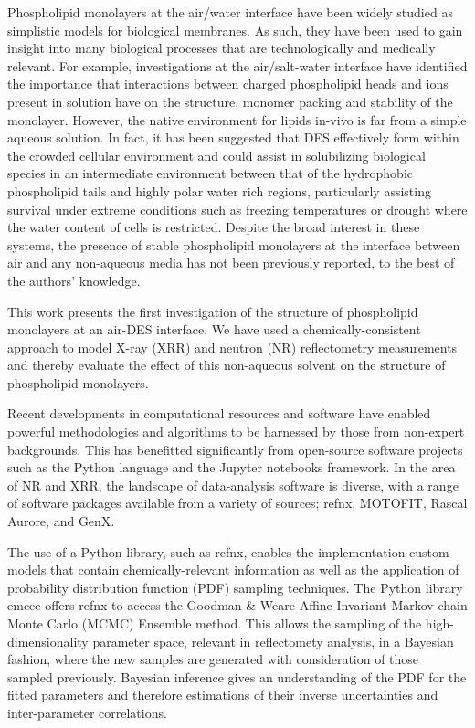 \documentclass[twocolumn,a4paper]{paper}
\begin{document}
Phospholipid monolayers at the air/water interface have been widely studied as simplistic models for biological membranes.
As such, they have been used to gain insight into many biological processes that are technologically and medically relevant.
For example, investigations at the air/salt-water interface have identified the importance that interactions between charged phospholipid heads and ions present in solution have on the structure, monomer packing and stability of the monolayer\cite{Mohwald1990,Kewalramani2010}.
However, the native environment for lipids in-vivo is far from a simple aqueous solution.
In fact, it has been suggested\cite{Choi2011,Hammond2017} that DES effectively form within the crowded cellular environment and could assist in solubilizing biological species in an intermediate environment between that of the hydrophobic phospholipid tails and highly polar water rich regions, particularly assisting survival under extreme conditions such as freezing temperatures or drought where the water content of cells is restricted.
Despite the broad interest in these systems, the presence of stable phospholipid monolayers at the interface between air and any non-aqueous media has not been previously reported, to the best of the authors' knowledge.

This work presents the first investigation of the structure of phospholipid monolayers at an air-DES interface.
We have used a chemically-consistent approach to model X-ray (XRR) and neutron (NR) reflectometry measurements and thereby evaluate the effect of this non-aqueous solvent on the structure of phospholipid monolayers.

Recent developments in computational resources and software have enabled powerful methodologies and algorithms to be harnessed by those from non-expert backgrounds.
This has benefitted significantly from open-source software projects such as the Python language\cite{vanRossum1995} and the Jupyter notebooks framework\cite{Kluyver2016}.
In the area of NR and XRR, the landscape of data-analysis software is diverse, with a range of software packages available from a variety of sources; refnx\cite{Nelson2018}, MOTOFIT\cite{Nelson2006}, Rascal\cite{HughesRascal} Aurore\cite{Gerelli2016}, and GenX\cite{Bjorck2007}.

The use of a Python library, such as refnx, enables the implementation custom models that contain chemically-relevant information as well as the application of probability distribution function (PDF) sampling techniques.
The Python library emcee\cite{Foreman-Mackey2013} offers refnx to access the Goodman \& Weare Affine Invariant Markov chain Monte Carlo (MCMC) Ensemble method\cite{Goodman2010}.
This allows the sampling of the high-dimensionality parameter space, relevant in reflectomety analysis, in a Bayesian fashion, where the new samples are generated with consideration of those sampled previously\cite{Sivia2006}.
Bayesian inference gives an understanding of the PDF for the fitted parameters and therefore estimations of their inverse uncertainties and inter-parameter correlations.
\end{document}

